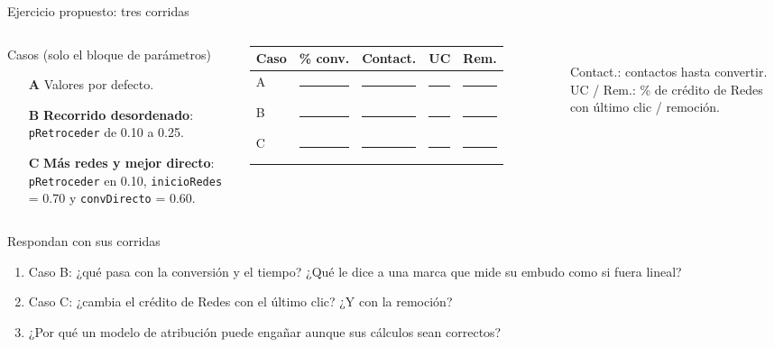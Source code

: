 \documentclass[aspectratio=169,xcolor=dvipsnames]{beamer}
\begin{document}
\begin{frame}{Ejercicio propuesto: tres corridas}
\begin{columns}[T]
  \begin{exampleblock}{Casos (solo el bloque de parámetros)}
    \scriptsize
    \begin{itemize}
      \item[\textbf{A}] Valores por defecto.
      \item[\textbf{B}] \textbf{Recorrido desordenado}: \texttt{pRetroceder} de 0.10 a 0.25.
      \item[\textbf{C}] \textbf{Más redes y mejor directo}: \texttt{pRetroceder} en 0.10, \texttt{inicioRedes} = 0.70 y \texttt{convDirecto} = 0.60.
    \end{itemize}
  \end{exampleblock}
  \scriptsize
  \begin{tabular}{@{}lcccc@{}}
    \toprule
    Caso & \% conv. & Contact. & UC & Rem. \\
    \midrule
    A & \rule{0.55cm}{0.4pt} & \rule{0.55cm}{0.4pt} & \rule{0.55cm}{0.4pt} & \rule{0.55cm}{0.4pt} \\[2pt]
    B & \rule{0.55cm}{0.4pt} & \rule{0.55cm}{0.4pt} & \rule{0.55cm}{0.4pt} & \rule{0.55cm}{0.4pt} \\[2pt]
    C & \rule{0.55cm}{0.4pt} & \rule{0.55cm}{0.4pt} & \rule{0.55cm}{0.4pt} & \rule{0.55cm}{0.4pt} \\
    \bottomrule
  \end{tabular}\\[2pt]
  {\tiny Contact.: contactos hasta convertir. UC / Rem.: \% de crédito de Redes con último clic / remoción.}
\end{columns}
\vspace{2pt}
\begin{block}{Respondan con sus corridas}
  \scriptsize
  \begin{enumerate}
    \item Caso B: ¿qué pasa con la conversión y el tiempo? ¿Qué le dice a una marca que mide su embudo como si fuera lineal?
    \item Caso C: ¿cambia el crédito de Redes con el último clic? ¿Y con la remoción?
    \item ¿Por qué un modelo de atribución puede engañar aunque sus cálculos sean correctos?
  \end{enumerate}
\end{block}
\end{frame}
\end{document}
